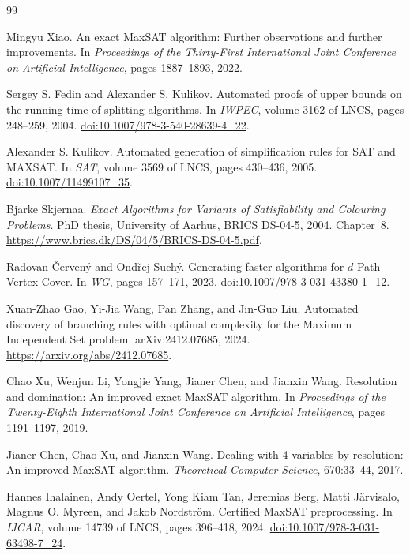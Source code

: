 \documentclass[11pt]{article}
\theoremstyle{definition}
\theoremstyle{remark}
\begin{document}
\begin{thebibliography}{99}

Mingyu Xiao.
\newblock An exact MaxSAT algorithm: Further observations and further
improvements.
\newblock In \emph{Proceedings of the Thirty-First International Joint
Conference on Artificial Intelligence}, pages 1887--1893, 2022.

Sergey S. Fedin and Alexander S. Kulikov.
\newblock Automated proofs of upper bounds on the running time of splitting algorithms.
\newblock In \emph{IWPEC}, volume 3162 of LNCS, pages 248--259, 2004.
\newblock \href{https://doi.org/10.1007/978-3-540-28639-4_22}{doi:10.1007/978-3-540-28639-4\_22}.

Alexander S. Kulikov.
\newblock Automated generation of simplification rules for SAT and MAXSAT.
\newblock In \emph{SAT}, volume 3569 of LNCS, pages 430--436, 2005.
\newblock \href{https://doi.org/10.1007/11499107_35}{doi:10.1007/11499107\_35}.

Bjarke Skjernaa.
\newblock \emph{Exact Algorithms for Variants of Satisfiability and Colouring Problems}.
\newblock PhD thesis, University of Aarhus, BRICS DS-04-5, 2004. Chapter~8.
\newblock \url{https://www.brics.dk/DS/04/5/BRICS-DS-04-5.pdf}.

Radovan \v{C}erven\'y and Ond\v{r}ej Such\'y.
\newblock Generating faster algorithms for $d$-Path Vertex Cover.
\newblock In \emph{WG}, pages 157--171, 2023.
\newblock \href{https://doi.org/10.1007/978-3-031-43380-1_12}{doi:10.1007/978-3-031-43380-1\_12}.

Xuan-Zhao Gao, Yi-Jia Wang, Pan Zhang, and Jin-Guo Liu.
\newblock Automated discovery of branching rules with optimal complexity for
  the Maximum Independent Set problem.
\newblock arXiv:2412.07685, 2024.
\newblock \url{https://arxiv.org/abs/2412.07685}.

Chao Xu, Wenjun Li, Yongjie Yang, Jianer Chen, and Jianxin Wang.
\newblock Resolution and domination: An improved exact MaxSAT algorithm.
\newblock In \emph{Proceedings of the Twenty-Eighth International Joint
Conference on Artificial Intelligence}, pages 1191--1197, 2019.

Jianer Chen, Chao Xu, and Jianxin Wang.
\newblock Dealing with 4-variables by resolution: An improved MaxSAT algorithm.
\newblock \emph{Theoretical Computer Science}, 670:33--44, 2017.

Hannes Ihalainen, Andy Oertel, Yong Kiam Tan, Jeremias Berg,
Matti J\"arvisalo, Magnus O. Myreen, and Jakob Nordstr\"om.
\newblock Certified MaxSAT preprocessing.
\newblock In \emph{IJCAR}, volume 14739 of LNCS, pages 396--418, 2024.
\newblock \href{https://doi.org/10.1007/978-3-031-63498-7_24}{doi:10.1007/978-3-031-63498-7\_24}.

\end{thebibliography}
\end{document}
